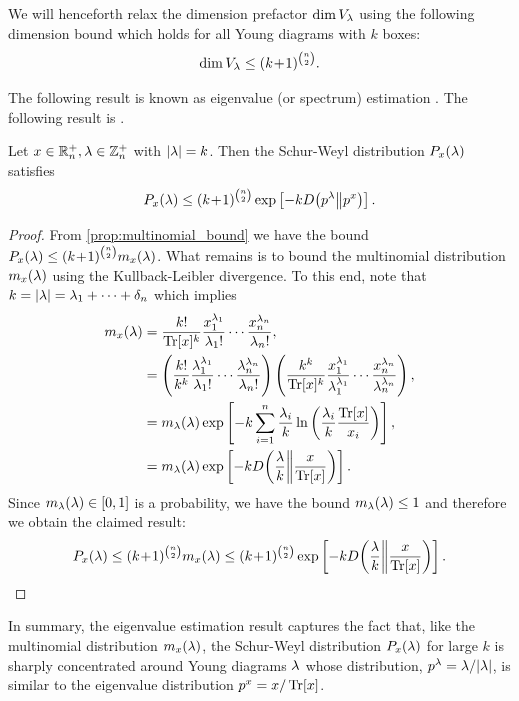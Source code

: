 \documentclass[notitlepage, 11pt, letterpaper]{amsart}
\begin{document}
\begin{rem}
    We will henceforth relax the dimension prefactor $\dim V_{\lambda}$ using the following dimension bound which holds for all Young diagrams with $k$ boxes:
    \begin{equation}
        \label{eq:unitary_irrep_dim_bound}
        \dim V_{\lambda} \leq (k\!+\!1)^{\binom{n}{2}}.
    \end{equation}
\end{rem}
The following result is known as eigenvalue (or spectrum) estimation \cite{alicki1988symmetry,keyl2001estimating,hayashi2002quantum,odonnell2016efficient}.
The following result is \cite[Theorem 1]{christandl2006spectra}.
\begin{prop}
    \label{prop:eig_est}
    Let $x \in \mathbb R^{+}_{n}, \lambda \in \mathbb Z^{+}_{n}$ with $|\lambda| = k$.
    Then the Schur-Weyl distribution $P_{x}(\lambda)$ satisfies
    \begin{equation}
        P_{x}(\lambda) \leq (k\!+\!1)^{\binom{n}{2}} \exp\left[-k D\!\left(p^{\lambda}\middle\|p^x\right)\right].
    \end{equation}
\end{prop}
\begin{proof}
    From \cref{prop:multinomial_bound} we have the bound $P_{x}(\lambda) \leq (k\!+\!1)^{\binom{n}{2}} m_{x}(\lambda)$.
    What remains is to bound the multinomial distribution $m_{x}(\lambda)$ using the Kullback-Leibler divergence.
    To this end, note that $k = |\lambda| = \lambda_1 + \cdots + \delta_n$ which implies
    \begin{align}
        \begin{split}
            m_{x}(\lambda)
            &= \frac{k!}{\operatorname{Tr}[x]^{k}}\frac{x_1^{\lambda_1}}{\lambda_1!}\cdots \frac{x_n^{\lambda_n}}{\lambda_n!}, \\
            &= \left(\frac{k!}{k^{k}} \frac{\lambda_1^{\lambda_1}}{\lambda_1!} \cdots \frac{\lambda_n^{\lambda_n}}{\lambda_n!}\right)
            \left(\frac{k^{k}}{\operatorname{Tr}[x]^{k}}\frac{x_1^{\lambda_1}}{\lambda_1^{\lambda_1}}\cdots \frac{x_n^{\lambda_n}}{\lambda_n^{\lambda_n}}\right), \\
            &= m_{\lambda}(\lambda)
            \exp\left[ - k \sum_{i=1}^{n} \frac{\lambda_i}{k} \ln \left(\frac{\lambda_i}{k} \frac{\operatorname{Tr}[x]}{x_i}\right)  \right], \\
            &= m_{\lambda}(\lambda)
            \exp\left[ - k D\!\left(\frac{\lambda}{k}\middle\|\frac{x}{\operatorname{Tr}[x]}\right) \right].
        \end{split}
    \end{align}
    Since $m_{\lambda}(\lambda) \in [0,1]$ is a probability, we have the bound $m_{\lambda}(\lambda) \leq 1$ and therefore we obtain the claimed result:
    \begin{equation}
        P_{x}(\lambda) \leq (k\!+\!1)^{\binom{n}{2}} m_{x}(\lambda) \leq (k\!+\!1)^{\binom{n}{2}}\exp\left[ - k D\!\left(\frac{\lambda}{k}\middle\|\frac{x}{\operatorname{Tr}[x]}\right) \right].
    \end{equation}
\end{proof}
In summary, the eigenvalue estimation result captures the fact that, like the multinomial distribution $m_x(\lambda)$, the Schur-Weyl distribution $P_{x}(\lambda)$ for large $k$ is sharply concentrated around Young diagrams $\lambda$ whose distribution, $p^{\lambda} = \lambda/|\lambda|$, is similar to the eigenvalue distribution $p^{x} = x/\operatorname{Tr}[x]$.
\end{document}
